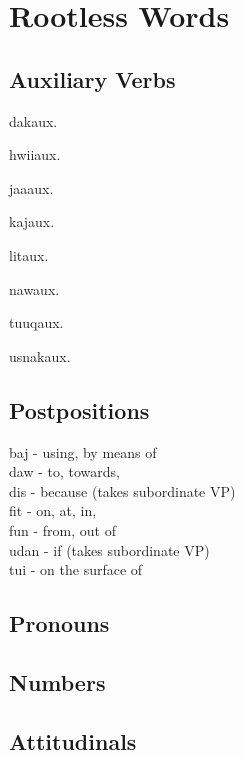 \chapter{Rootless Words}
\begin{multicols*}{2}
\section{Auxiliary Verbs}
\begin{description}[leftmargin=*]
    \begin{dictentry}{dak}{aux.}
    \end{dictentry}
    \begin{dictentry}{hwii}{aux.}
    \end{dictentry}
    \begin{dictentry}{jaa}{aux.}
    \end{dictentry}
    \begin{dictentry}{kaj}{aux.}
    \end{dictentry}
    \begin{dictentry}{lit}{aux.}
    \end{dictentry}
    \begin{dictentry}{naw}{aux.}
    \end{dictentry}
    \begin{dictentry}{tuuq}{aux.}
    \end{dictentry}
    \begin{dictentry}{usnak}{aux.}
    \end{dictentry}
\end{description}

\section{Postpositions}

baj - using, by means of\\
daw - to, towards,\\
dis - because (takes subordinate VP)\\
fit - on, at, in,\\
fun - from, out of\\
udan - if (takes subordinate VP)\\
tui - on the surface of\\

\section{Pronouns}

\section{Numbers}

\section{Attitudinals}

\end{multicols*}
